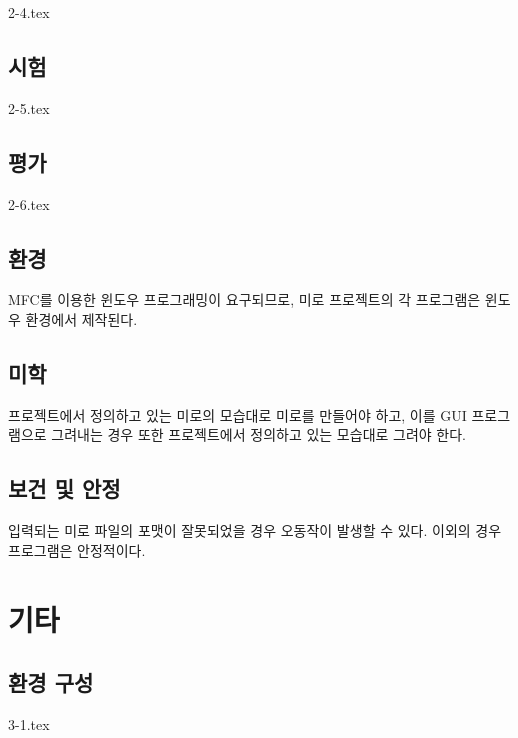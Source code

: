 {2-4.tex}

\subsection{시험}
{2-5.tex}

\subsection{평가}
{2-6.tex}

\subsection{환경}
MFC를 이용한 윈도우 프로그래밍이 요구되므로, 미로 프로젝트의 각 프로그램은 윈도우 환경에서 제작된다.

\subsection{미학}
프로젝트에서 정의하고 있는 미로의 모습대로 미로를 만들어야 하고, 이를 GUI 프로그램으로 그려내는 경우 또한 프로젝트에서 정의하고 있는 모습대로 그려야 한다. 

\subsection{보건 및 안정}
입력되는 미로 파일의 포맷이 잘못되었을 경우 오동작이 발생할 수 있다. 이외의 경우 프로그램은 안정적이다.

\section{기타}
\subsection{환경 구성}
{3-1.tex}

